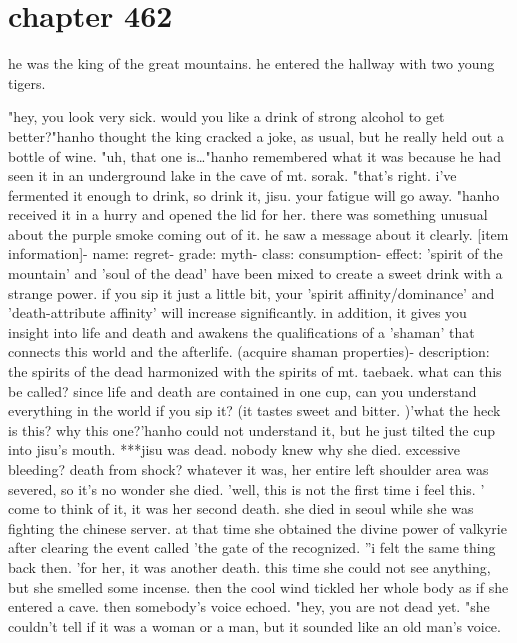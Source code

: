 \section{chapter 462}

he was the king of the great mountains.
 he entered the hallway with two young tigers.





"hey, you look very sick.
 would you like a drink of strong alcohol to get better?"hanho thought the king cracked a joke, as usual, but he really held out a bottle of wine.
"uh, that one is…"hanho remembered what it was because he had seen it in an underground lake in the cave of mt.
 sorak.
"that's right.
 i've fermented it enough to drink, so drink it, jisu.
 your fatigue will go away.
"hanho received it in a hurry and opened the lid for her.
there was something unusual about the purple smoke coming out of it.
he saw a message about it clearly.
[item information]- name: regret- grade: myth- class: consumption- effect: 'spirit of the mountain' and 'soul of the dead' have been mixed to create a sweet drink with a strange power.
 if you sip it just a little bit, your 'spirit affinity/dominance' and 'death-attribute affinity' will increase significantly.
in addition, it gives you insight into life and death and awakens the qualifications of a 'shaman' that connects this world and the afterlife.
 (acquire shaman properties)- description: the spirits of the dead harmonized with the spirits of mt.
 taebaek.
 what can this be called? since life and death are contained in one cup, can you understand everything in the world if you sip it? (it tastes sweet and bitter.
)'what the heck is this? why this one?'hanho could not understand it, but he just tilted the cup into jisu's mouth.
***jisu was dead.
 nobody knew why she died.
 excessive bleeding? death from shock? whatever it was, her entire left shoulder area was severed, so it's no wonder she died.
'well, this is not the first time i feel this.
'
come to think of it, it was her second death.
she died in seoul while she was fighting the chinese server.
at that time she obtained the divine power of valkyrie after clearing the event called 'the gate of the recognized.
''i felt the same thing back then.
'for her, it was another death.
 this time she could not see anything, but she smelled some incense.
 then the cool wind tickled her whole body as if she entered a cave.
then somebody's voice echoed.
"hey, you are not dead yet.
"she couldn't tell if it was a woman or a man, but it sounded like an old man's voice.
